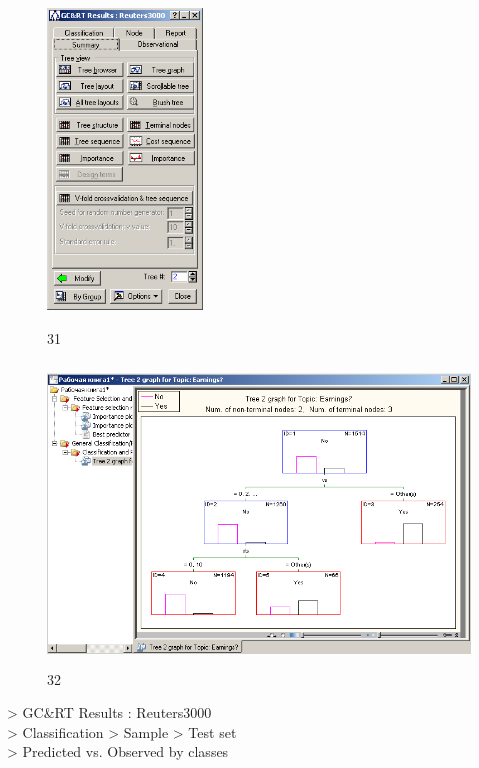\begin{figure}[!h]
  \centering

  \begin{minipage}{0.29\textwidth}
    \centering

    \includegraphics[height=8cm]
    {inc/31.PNG}

    \caption{31}

    \label{fig:31}
  \end{minipage}
  \begin{minipage}{0.69\textwidth}
    \centering

    \includegraphics[height=8cm]
    {inc/32.PNG}

    \caption{32}

    \label{fig:32}
  \end{minipage}
\end{figure}

> GC\&RT Results : Reuters3000 \\
> Classification > Sample > Test set \\
> Predicted vs. Observed by classes \\

